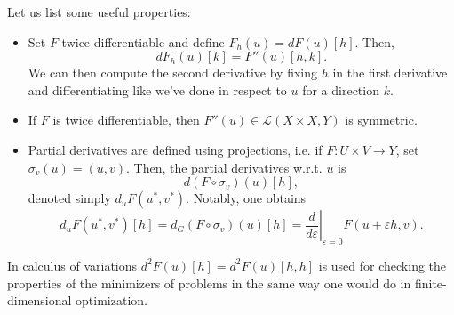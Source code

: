 Let us list some useful properties:
\begin{itemize}
    \item Set $F$ twice differentiable and define $F_h(u)=dF(u)[h]$. Then,
    \begin{equation}\label{eq:second-derivative-property}
        dF_h(u)[k] = F''(u)[h,k]. 
    \end{equation}
    We can then compute the second derivative by fixing $h$ in the first derivative and differentiating like we've done in respect to $u$ for a direction $k$.
    \item If $F$ is twice differentiable, then $F''(u)\in \mathcal{L}(X\times X, Y)$ is symmetric.
    \item Partial derivatives are defined using projections, i.e. if $F: U\times V \to Y$, set $\sigma_v(u)=(u,v)$. Then, the partial derivatives w.r.t. $u$ is
    \begin{equation*}
        d(F\circ \sigma_v)(u)[h],
    \end{equation*}
    denoted simply $d_u F(u^*,v^*)$. Notably, one obtains
    \begin{equation*}
        d_u F(u^*,v^*)[h] = d_G(F\circ \sigma_v)(u)[h] = \left.\frac{d}{d\varepsilon}\right|_{\varepsilon = 0} F(u+\varepsilon h, v).
    \end{equation*}
\end{itemize}


In calculus of variations $d^2 F(u)[h] = d^2 F(u)[h,h]$ is used for checking the properties of the minimizers of problems in the same way one would do in finite-dimensional optimization.

